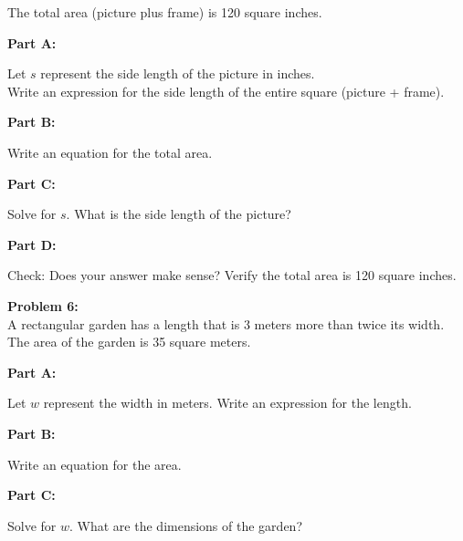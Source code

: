 \documentclass[12pt]{article}
\begin{document}
			The total area (picture plus frame) is 120 square inches.

			\vspace{0.5cm}

			\textbf{Part A:}
            
            Let $s$ represent the side length of the picture in inches.\\
            
            Write an expression for the side length of the entire square (picture + frame).

			\vspace{2cm}

			\textbf{Part B:}
            
            Write an equation for the total area.

			\vspace{3cm}

			\textbf{Part C:}
            
            Solve for $s$. What is the side length of the picture?

			\vspace{3cm}

			\textbf{Part D:}
            
            Check: Does your answer make sense? Verify the total area is 120 square inches.

			\newpage

			\textbf{Problem 6:}\\

			A rectangular garden has a length that is 3 meters more than twice its width.\\

			The area of the garden is 35 square meters.

			\vspace{0.5cm}

			\textbf{Part A:}
            
            Let $w$ represent the width in meters. Write an expression for the length.

			\vspace{2cm}

			\textbf{Part B:}
            
            Write an equation for the area.

			\vspace{3cm}

			\textbf{Part C:}
            
            Solve for $w$. What are the dimensions of the garden?
\end{document}
